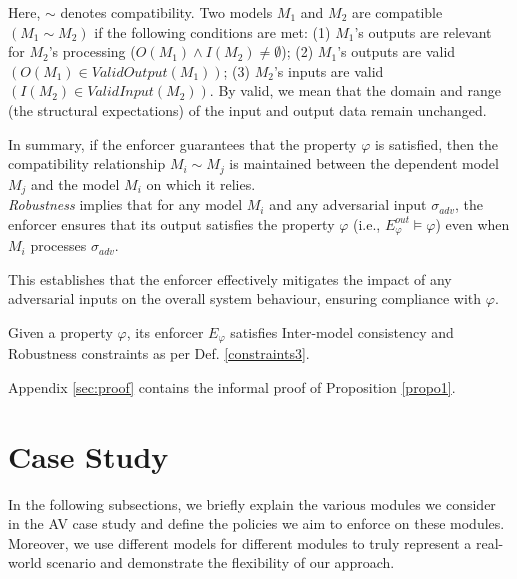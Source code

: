 Here, $\sim$ denotes compatibility. Two models $M_1$ and $M_2$ are compatible $(M_1 \sim M_2)$ if the following conditions are met: 
(1) $M_1$'s outputs are relevant for $M_2$'s processing ($O(M_1) \land I(M_2) \neq \emptyset$);
(2) $M_1$'s outputs are valid $(O(M_1) \in ValidOutput(M_1))$;
(3) $M_2$'s inputs are valid $(I(M_2) \in ValidInput(M_2))$.
By valid, we mean that the domain and range (the structural expectations) of the input and output data remain unchanged. 

In summary, if the enforcer guarantees that the property $\varphi$ is satisfied, then the compatibility relationship $M_i \sim M_j$ is maintained between the dependent model $M_j$ and the model $M_i$ on which it relies.\\


\textit{Robustness} implies that for any model $M_i$ and any adversarial input $\sigma_{adv}$, the enforcer ensures that its output satisfies the property $\varphi$ (i.e., $E^{out}_{\varphi} \models \varphi$) even when $M_i$ processes $\sigma_{adv}$.

This establishes that the enforcer effectively mitigates the impact of any adversarial inputs on the overall system behaviour, ensuring compliance with $\varphi$. 


\begin{proposition}
 Given a property $\varphi$, its enforcer $E_{\varphi}$ satisfies Inter-model consistency and Robustness constraints as per Def. \ref{constraints3}.
    \label{propo1}
\end{proposition}
Appendix \ref{sec:proof} contains the informal proof of Proposition \ref{propo1}.







\section{Case Study}
\label{sec:case_study}
In the following subsections, we briefly explain the various modules we consider in the AV case study and define the policies we aim to enforce on these modules. Moreover, we use different models for different modules to truly represent a real-world scenario and demonstrate the flexibility of our approach.

